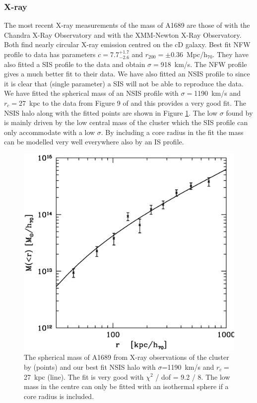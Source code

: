 \documentclass[useAMS,usenatbib]{mn2e}
\begin{document}
\subsubsection{X-ray}
\label{sec:literature_xray}
The most recent \mbox{X-ray} measurements of the mass of A1689 are
those of \citet{xue:02} with the Chandra X-Ray Observatory and
\citet{andersson:04} with the XMM-Newton X-Ray Observatory. Both find
nearly circular \mbox{X-ray} emission centred on the cD galaxy. Best
fit NFW profile to \citet{andersson:04} data has parameters
$c=$7.7$^{+1.7}_{-2.6}$ and $r_{200}=$$\pm$0.36~Mpc/h$_{70}$. They
have also fitted a SIS profile to the data and obtain
$\sigma=$918~km/s. The NFW profile gives a much better fit to their
data.  We have also fitted an NSIS profile to \citet{andersson:04}
since it is clear that (single parameter) a SIS will not be able to
reproduce the data. We have fitted the spherical mass of an NSIS
profile with $\sigma=$1190~km/s and $r_c=$27~kpc to the data from
Figure 9 of \citet{andersson:04} and this provides a very good
fit. The NSIS halo along with the fitted points are shown in Figure
\ref{fig:andersson_nsis}. The low $\sigma$ found by
\citet{andersson:04} is mainly driven by the low central mass of the
cluster which the SIS profile can only accommodate with a low
$\sigma$. By including a core radius in the fit the mass can be
modelled very well everywhere also by an IS profile.

\begin{figure}
  \centering
  \includegraphics[width=\columnwidth]{figs/mass_xray.ps}
  \caption{The spherical mass of A1689 from X-ray observations of the
  cluster by \citet{andersson:04} (points) and our best fit NSIS halo
  with $\sigma$=1190~km/s and $r_c=$27~kpc (line). The fit is very
  good with $\chi^2$ / dof = 9.2 / 8. The low mass in the centre can
  only be fitted with an isothermal sphere if a core radius is
  included.}
  \label{fig:andersson_nsis}
\end{figure}
\end{document}
